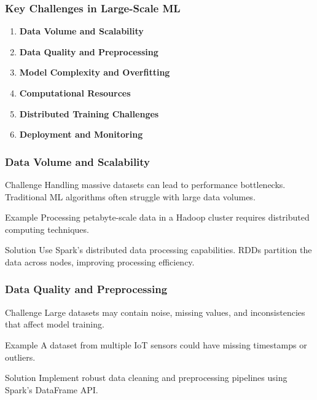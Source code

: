 \documentclass[aspectratio=169]{beamer}
\begin{document}
\begin{frame}
    \frametitle{Key Challenges in Large-Scale ML}
    \begin{enumerate}
        \item \textbf{Data Volume and Scalability}
        \item \textbf{Data Quality and Preprocessing}
        \item \textbf{Model Complexity and Overfitting}
        \item \textbf{Computational Resources}
        \item \textbf{Distributed Training Challenges}
        \item \textbf{Deployment and Monitoring}
    \end{enumerate}
\end{frame}

\begin{frame}[fragile]
    \frametitle{Data Volume and Scalability}
    \begin{block}{Challenge}
        Handling massive datasets can lead to performance bottlenecks. Traditional ML algorithms often struggle with large data volumes.
    \end{block}
    \begin{block}{Example}
        Processing petabyte-scale data in a Hadoop cluster requires distributed computing techniques.
    \end{block}
    \begin{block}{Solution}
        Use Spark's distributed data processing capabilities. RDDs partition the data across nodes, improving processing efficiency.
    \end{block}
\end{frame}

\begin{frame}[fragile]
    \frametitle{Data Quality and Preprocessing}
    \begin{block}{Challenge}
        Large datasets may contain noise, missing values, and inconsistencies that affect model training.
    \end{block}
    \begin{block}{Example}
        A dataset from multiple IoT sensors could have missing timestamps or outliers.
    \end{block}
    \begin{block}{Solution}
        Implement robust data cleaning and preprocessing pipelines using Spark’s DataFrame API.
    \end{block}
\end{frame}
\end{document}
